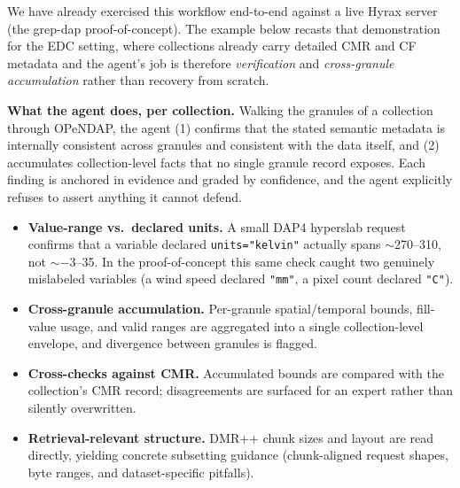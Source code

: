 
\begin{tcolorbox}[colback=gray!5,colframe=gray!50,boxrule=0.5pt,
    title={\textbf{Worked example: from per-granule verification to a retrieval recipe}},
    fonttitle=\normalsize]
\small
We have already exercised this workflow end-to-end against a live Hyrax server
(the grep-dap proof-of-concept). The example below recasts that demonstration
for the EDC setting, where collections already carry detailed CMR and CF
metadata and the agent's job is therefore \emph{verification} and
\emph{cross-granule accumulation} rather than recovery from scratch.

\textbf{What the agent does, per collection.} Walking the granules of a
collection through OPeNDAP, the agent (1) confirms that the stated semantic
metadata is internally consistent across granules and consistent with the data
itself, and (2) accumulates collection-level facts that no single granule
record exposes. Each finding is anchored in evidence and graded by confidence,
and the agent explicitly refuses to assert anything it cannot defend.

\begin{itemize}\itemsep1pt
  \item \textbf{Value-range vs.\ declared units.} A small DAP4 hyperslab
  request confirms that a variable declared \texttt{units="kelvin"} actually
  spans $\sim$270--310, not $\sim$$-3$--35. In the proof-of-concept this same
  check caught two genuinely mislabeled variables (a wind speed declared
  \texttt{"mm"}, a pixel count declared \texttt{"C"}).
  \item \textbf{Cross-granule accumulation.} Per-granule spatial/temporal
  bounds, fill-value usage, and valid ranges are aggregated into a single
  collection-level envelope, and divergence between granules is flagged.
  \item \textbf{Cross-checks against CMR.} Accumulated bounds are compared with
  the collection's CMR record; disagreements are surfaced for an expert rather
  than silently overwritten.
  \item \textbf{Retrieval-relevant structure.} DMR++ chunk sizes and layout are
  read directly, yielding concrete subsetting guidance (chunk-aligned request
  shapes, byte ranges, and dataset-specific pitfalls).
\end{itemize}


\end{tcolorbox}
